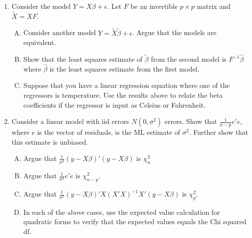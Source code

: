 \documentclass[12pt]{article}
\begin{document}
\begin{enumerate}[1.]
\item Consider the model $Y = X\beta + \epsilon$. Let $F$ be an invertible $p\times p$ matrix and $\tilde X = X F$. 
\begin{enumerate}[A.]
	\item Consider another model $Y = \tilde X \tilde \beta + \epsilon$. Argue that the models are equivalent.
	\item Show that the least squares estimate of $\tilde \beta$ from the second model is $F^{-1} \hat \beta$ where $\hat \beta$ is the least squares
	estimate from the first model.
	\item Suppose that you have a linear regression equation where one of the regressors is temperature. Use the results above to relate the
		beta coefficients if the regressor is input as Celsius or Fahrenheit.
\end{enumerate}
\item Consider a linear model with iid errors $N(0, \sigma^2)$ errors. Show that $\frac{1}{n-p} e'e$, where $e$ is the vector of residuals, is the
	ML estimate of $\sigma^2$. Further show that this estimate is unbiased.
\begin{enumerate}[A.]
	\item Argue that $\frac{1}{\sigma^2} (y - X\beta)' (y - X\beta)$ is $\chi^2_n$
	\item Argue that $\frac{1}{\sigma^2} e'e$ is $\chi^2_{n-p}$.
	\item Argue that $\frac{1}{\sigma^2} (y - X \beta)' X(X'X)^{-1} X' (y - X\beta)$ is $\chi^2_p$.
	\item In each of the above cases, use the expected value calculation for quadratic forms to verify that the expected values equals the Chi squared df.
\end{enumerate}
\end{enumerate}
\end{document}
